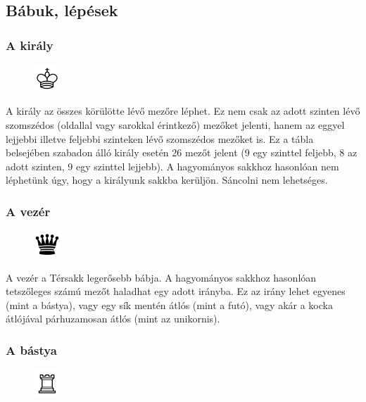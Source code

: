 \documentclass[12pt, twoside]{report}
\begin{document}
\subsection{Bábuk, lépések}

\subsubsection{A király}

\begin{figure}
	\includegraphics[width=10mm, height=10mm]{white-king}
\end{figure}

A király az összes körülötte lévő mezőre léphet. Ez nem csak az adott szinten lévő szomszédos (oldallal vagy sarokkal érintkező) mezőket jelenti, hanem az eggyel lejjebbi illetve feljebbi szinteken lévő szomszédos mezőket is. Ez a tábla belsejében szabadon álló király esetén 26 mezőt jelent (9 egy szinttel feljebb, 8 az adott szinten, 9 egy szinttel lejjebb). A hagyományos sakkhoz hasonlóan nem léphetünk úgy, hogy a királyunk sakkba kerüljön. Sáncolni nem lehetséges.

\subsubsection{A vezér}

\begin{figure}
	\includegraphics[width=10mm, height=10mm]{black-queen}
\end{figure}

A vezér a Térsakk legerősebb bábja. A hagyományos sakkhoz hasonlóan tetszőleges számú mezőt haladhat egy adott irányba. Ez az irány lehet egyenes (mint a bástya), vagy egy sík mentén átlós (mint a futó), vagy akár a kocka átlójával párhuzamosan átlós (mint az unikornis).

\subsubsection{A bástya}

\begin{figure}
	\includegraphics[width=10mm, height=10mm]{white-rook}
\end{figure}
\end{document}
